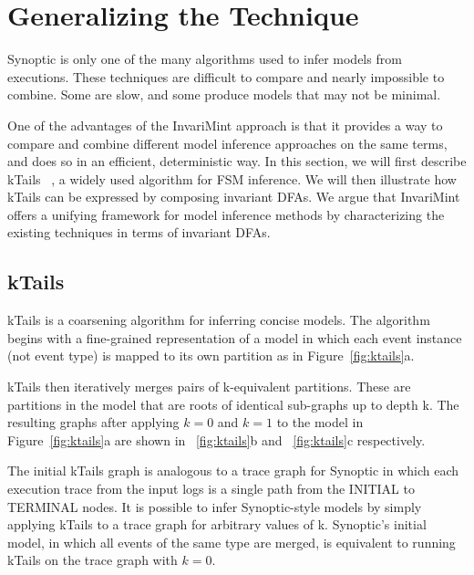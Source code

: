 \section{Generalizing the Technique}
\label{sec:generalizing}
Synoptic is only one of the many algorithms used to infer models from
executions.  These techniques are difficult to compare and nearly impossible
to combine.  Some are slow, and some produce models that may not
be minimal. 

One of the advantages of the InvariMint approach is that it
provides a way to compare and combine different model inference approaches on the
same terms, and does so in an efficient, deterministic way.
In this section, we will first describe kTails ~\cite{kTailsOrigin}, a widely
used algorithm for FSM inference. We will then illustrate how kTails can
be expressed by composing invariant DFAs. We argue that InvariMint offers a
unifying framework for model inference methods by characterizing the existing
techniques in terms of invariant DFAs.


\subsection{kTails}

kTails is a coarsening algorithm for inferring concise models.
The algorithm begins with a fine-grained representation of a model in
which each event instance (not event type) is mapped to its own partition as in
Figure~\ref{fig:ktails}a.

kTails then iteratively merges pairs of
k-equivalent partitions. These are partitions in the model that are roots of
identical sub-graphs 
up to depth k. The resulting graphs after applying $k = 0$ and $k = 1$ to the
model in Figure~\ref{fig:ktails}a are shown in ~\ref{fig:ktails}b and
~\ref{fig:ktails}c respectively. 

The initial kTails graph is analogous to a trace graph for Synoptic in which
each execution trace from the input logs is a single path from the INITIAL to
TERMINAL nodes. It is possible to infer Synoptic-style models by simply applying
kTails to a trace graph for arbitrary values of k. Synoptic's initial model, in
which all events of the same type are merged, is
equivalent to running kTails on the trace graph with $k = 0$.

